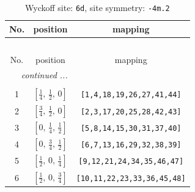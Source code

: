 \documentclass[fleqn,8pt]{jsarticle}
\begin{document}
\begin{longtable}{ccc}
\caption{Wyckoff site: {\tt 6d}, site symmetry: {\tt -4m.2}}
 \\
 \hline \hline
No. & position & mapping \\ \hline \endfirsthead

\multicolumn{2}{l}{\tablename\ \thetable{}} \\
 \hline \hline
No. & position & mapping \\ \hline \endhead

 \hline \hline
\multicolumn{2}{r}{\footnotesize\it continued ...} \\ \endfoot

 \hline \hline
\multicolumn{2}{r}{} \\ \endlastfoot

1 & $\left[ \frac{1}{4},\, \frac{1}{2},\, 0 \right]$ & {\tt [1,4,18,19,26,27,41,44]} \\ \hline
2 & $\left[ \frac{3}{4},\, \frac{1}{2},\, 0 \right]$ & {\tt [2,3,17,20,25,28,42,43]} \\ \hline
3 & $\left[ 0,\, \frac{1}{4},\, \frac{1}{2} \right]$ & {\tt [5,8,14,15,30,31,37,40]} \\ \hline
4 & $\left[ 0,\, \frac{3}{4},\, \frac{1}{2} \right]$ & {\tt [6,7,13,16,29,32,38,39]} \\ \hline
5 & $\left[ \frac{1}{2},\, 0,\, \frac{1}{4} \right]$ & {\tt [9,12,21,24,34,35,46,47]} \\ \hline
6 & $\left[ \frac{1}{2},\, 0,\, \frac{3}{4} \right]$ & {\tt [10,11,22,23,33,36,45,48]} \\
\end{longtable}
\renewcommand{\arraystretch}{1.2}
\end{document}
